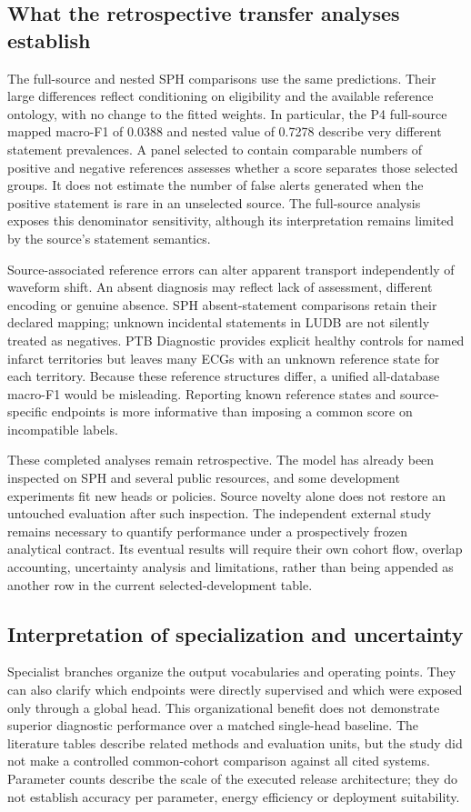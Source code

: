 \subsection{What the retrospective transfer analyses establish}
\label{sec:discussion-transfer}
The full-source and nested SPH comparisons use the same predictions. Their large differences reflect conditioning on eligibility and the available reference ontology, with no change to the fitted weights. In particular, the P4 full-source mapped macro-F1 of 0.0388 and nested value of 0.7278 describe very different statement prevalences. A panel selected to contain comparable numbers of positive and negative references assesses whether a score separates those selected groups. It does not estimate the number of false alerts generated when the positive statement is rare in an unselected source. The full-source analysis exposes this denominator sensitivity, although its interpretation remains limited by the source's statement semantics.

Source-associated reference errors can alter apparent transport independently of waveform shift. An absent diagnosis may reflect lack of assessment, different encoding or genuine absence. SPH absent-statement comparisons retain their declared mapping; unknown incidental statements in LUDB are not silently treated as negatives. PTB Diagnostic provides explicit healthy controls for named infarct territories but leaves many ECGs with an unknown reference state for each territory. Because these reference structures differ, a unified all-database macro-F1 would be misleading. Reporting known reference states and source-specific endpoints is more informative than imposing a common score on incompatible labels.

These completed analyses remain retrospective. The model has already been inspected on SPH and several public resources, and some development experiments fit new heads or policies. Source novelty alone does not restore an untouched evaluation after such inspection. The independent external study remains necessary to quantify performance under a prospectively frozen analytical contract. Its eventual results will require their own cohort flow, overlap accounting, uncertainty analysis and limitations, rather than being appended as another row in the current selected-development table.

\subsection{Interpretation of specialization and uncertainty}
\label{sec:discussion-specialization}
Specialist branches organize the output vocabularies and operating points. They can also clarify which endpoints were directly supervised and which were exposed only through a global head. This organizational benefit does not demonstrate superior diagnostic performance over a matched single-head baseline. The literature tables describe related methods and evaluation units, but the study did not make a controlled common-cohort comparison against all cited systems. Parameter counts describe the scale of the executed release architecture; they do not establish accuracy per parameter, energy efficiency or deployment suitability.


